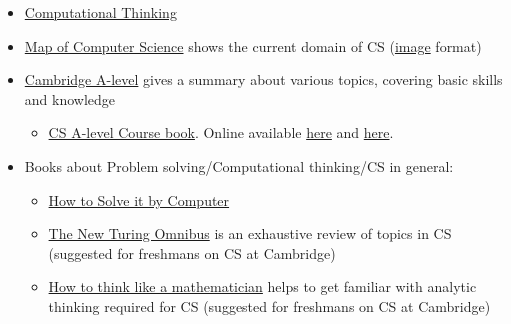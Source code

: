 \documentclass{article}
\begin{document}
\begin{itemize}
    
    \item \href{https://www.cs.cmu.edu/~15110-s13/Wing06-ct.pdf}{Computational Thinking}
    
    \item \href{https://www.youtube.com/watch?v=SzJ46YA_RaA}{Map of Computer Science} shows the current domain of CS (\href{https://i.pinimg.com/originals/b0/d1/da/b0d1da585ebcac73f17e10e91b30eaf6.png}{image} format)

    \item \href{https://www.cambridgeinternational.org/programmes-and-qualifications/cambridge-international-as-and-a-level-computer-science-9608/}{Cambridge A-level} gives a summary about various topics, covering basic skills and knowledge
    \begin{itemize}
        \item \href{https://www.goodreads.com/book/show/13725701-cambridge-international-as-and-a-level-computing-coursebook}{CS A-level Course book}. Online available \href{https://web.archive.org/web/20170711125358/https://www.gceguide.xyz/files/e-books/a-level/Computing.pdf}{here} and \href{https://web.archive.org/web/20210228062647/https://www.gceguide.xyz/gce-e-books/cambridge-international-as-a-level-computer-science-coursebook}{here}.
    \end{itemize}
     
    \item Books about Problem solving/Computational thinking/CS in general:
    \begin{itemize}

        \item \href{https://www.goodreads.com/book/show/3086628-how-to-solve-it-by-computer}{How to Solve it by Computer}

    
        \item \href{https://www.goodreads.com/book/show/964709.The_New_Turing_Omnibus}{The New Turing Omnibus} is an exhaustive review of topics in CS (suggested for freshmans on CS at Cambridge)
    
        \item \href{https://www.goodreads.com/book/show/6220915-how-to-think-like-a-mathematician}{How to think like a mathematician} helps to get familiar with analytic thinking required for CS (suggested for freshmans on CS at Cambridge)
    
    \end{itemize}
    

\end{itemize}
\end{document}
